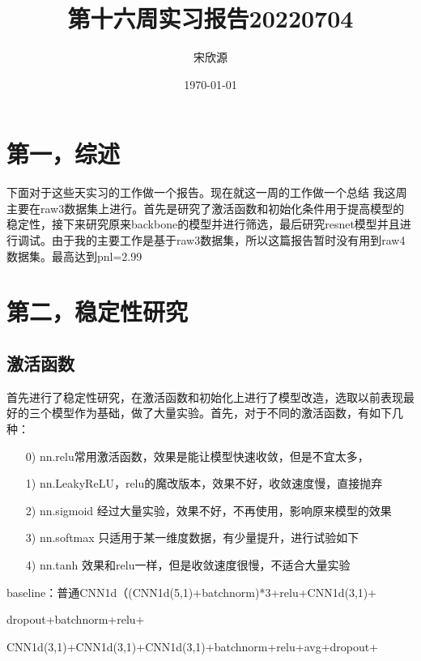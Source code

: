 \documentclass[11pt]{ctexart}
\begin{document}
\title{第十六周实习报告20220704}
\author{宋欣源}
\date{\today}

\maketitle %


\section{第一，综述}

下面对于这些天实习的工作做一个报告。现在就这一周的工作做一个总结
我这周主要在raw3数据集上进行。首先是研究了激活函数和初始化条件用于提高模型的稳定性，接下来研究原来backbone的模型并进行筛选，最后研究resnet模型并且进行调试。由于我的主要工作是基于raw3数据集，所以这篇报告暂时没有用到raw4数据集。最高达到pnl=2.99

\section{第二，稳定性研究}

\subsection{激活函数}
首先进行了稳定性研究，在激活函数和初始化上进行了模型改造，选取以前表现最好的三个模型作为基础，做了大量实验。首先，对于不同的激活函数，有如下几种：
\begin{itemize}
  \item [0)]
    nn.relu常用激活函数，效果是能让模型快速收敛，但是不宜太多，
  \item [1)]
    nn.LeakyReLU，relu的魔改版本，效果不好，收敛速度慢，直接抛弃
  \item [2)]
    nn.sigmoid 经过大量实验，效果不好，不再使用，影响原来模型的效果
  \item [3)]
    nn.softmax 只适用于某一维度数据，有少量提升，进行试验如下
  \item [4)]
    nn.tanh 效果和relu一样，但是收敛速度很慢，不适合大量实验

\end{itemize}

baseline：普通CNN1d（(CNN1d(5,1)+batchnorm)*3+relu+CNN1d(3,1)+

dropout+batchnorm+relu+

CNN1d(3,1)+CNN1d(3,1)+CNN1d(3,1)+batchnorm+relu+avg+dropout+
\end{document}
